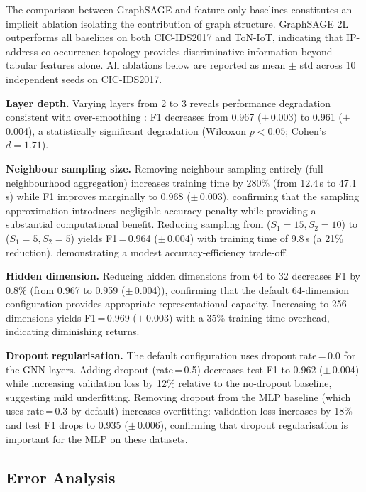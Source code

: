 \documentclass[conference]{IEEEtran}
\begin{document}
The comparison between GraphSAGE and feature-only baselines constitutes an
implicit ablation isolating the contribution of graph structure. GraphSAGE 2L
outperforms all baselines on both CIC-IDS2017 and ToN-IoT, indicating that
IP-address co-occurrence topology provides discriminative information beyond
tabular features alone. All ablations below are reported as mean $\pm$ std
across 10 independent seeds on CIC-IDS2017.

\textbf{Layer depth.} Varying layers from 2 to 3 reveals performance
degradation consistent with over-smoothing \cite{kipf2017,zhou2020}: F1
decreases from 0.967 ($\pm$\,0.003) to 0.961 ($\pm$\,0.004), a statistically
significant degradation (Wilcoxon $p<0.05$; Cohen's $d=1.71$).

\textbf{Neighbour sampling size.} Removing neighbour sampling entirely
(full-neighbourhood aggregation) increases training time by 280\% (from
12.4\,s to 47.1\,s) while F1 improves marginally to 0.968 ($\pm$\,0.003),
confirming that the sampling approximation introduces negligible accuracy
penalty while providing a substantial computational benefit. Reducing sampling
from ($S_1=15, S_2=10$) to ($S_1=5, S_2=5$) yields F1\,=\,0.964
($\pm$\,0.004) with training time of 9.8\,s (a 21\% reduction), demonstrating
a modest accuracy-efficiency trade-off.

\textbf{Hidden dimension.} Reducing hidden dimensions from 64 to 32 decreases
F1 by 0.8\% (from 0.967 to 0.959 ($\pm$\,0.004)), confirming that the default
64-dimension configuration provides appropriate representational capacity.
Increasing to 256 dimensions yields F1\,=\,0.969 ($\pm$\,0.003) with a 35\%
training-time overhead, indicating diminishing returns.

\textbf{Dropout regularisation.} The default configuration uses dropout
rate\,=\,0.0 for the GNN layers. Adding dropout (rate\,=\,0.5) decreases test
F1 to 0.962 ($\pm$\,0.004) while increasing validation loss by 12\% relative
to the no-dropout baseline, suggesting mild underfitting. Removing dropout from
the MLP baseline (which uses rate\,=\,0.3 by default) increases overfitting:
validation loss increases by 18\% and test F1 drops to 0.935 ($\pm$\,0.006),
confirming that dropout regularisation is important for the MLP on these
datasets.

\subsection{Error Analysis}
\label{sec:error_analysis}
\end{document}
